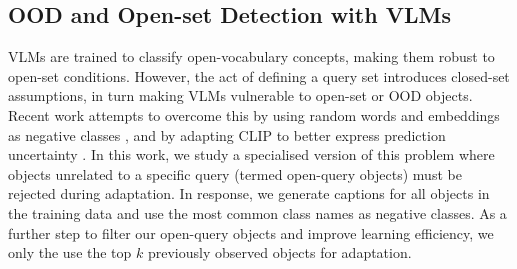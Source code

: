 
\subsection{OOD and Open-set Detection with VLMs}
VLMs are trained to classify open-vocabulary concepts, making them robust to open-set conditions. However, the act of defining a query set introduces closed-set assumptions, in turn making VLMs vulnerable to open-set \cite{open_vlm, bare} or OOD \cite{ueo} objects. Recent work attempts to overcome this by using random words and embeddings as negative classes \cite{open_vlm}, and by adapting CLIP to better express prediction uncertainty \cite{probvlm}. 
In this work, we study a specialised version of this problem where objects unrelated to a specific query (termed open-query objects) must be rejected during adaptation.
In response, we generate captions for all objects in the training data and use the most common class names as negative classes. As a further step to filter our open-query objects and improve learning efficiency, we only the use the top $k$ previously observed objects for adaptation.
